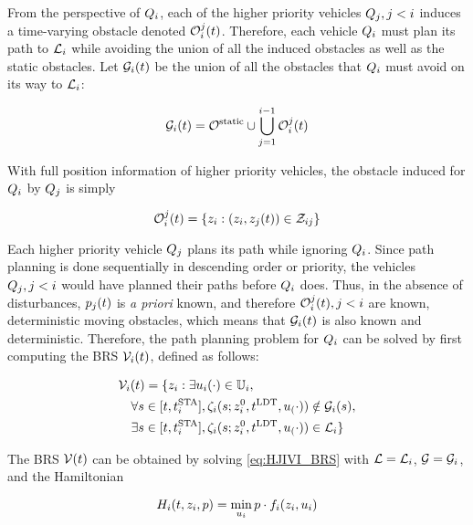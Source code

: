 From the perspective of $Q_i$, each of the higher priority vehicles $Q_j, j<i$ induces a time-varying obstacle denoted $\mathcal{O}_i^j(t)$. Therefore, each vehicle $Q_i$ must plan its path to $\mathcal{L}_i$ while avoiding the union of all the induced obstacles as well as the static obstacles. Let $\mathcal{G}_i(t)$ be the union of all the obstacles that $Q_i$ must avoid on its way to $\mathcal{L}_i$:

\begin{equation}
\label{eq:obsseti}
\obsset_i(t)  = \soset \cup \bigcup_{j=1}^{i-1} \ioset_i^j(t)
\end{equation}

With full position information of higher priority vehicles, the obstacle induced for $Q_i$ by $Q_j$ is simply

\begin{equation}
\label{eq:ioset}
\ioset_i^j(t) = \{\state_i: (\state_i, \state_j(t)) \in \dz_{ij}\}
\end{equation}

Each higher priority vehicle $Q_j$ plans its path while ignoring $Q_i$. Since path planning is done sequentially in descending order or priority, the vehicles $Q_j, j<i$ would have planned their paths before $Q_i$ does. Thus, in the absence of disturbances, $p_j(t)$ is \textit{a priori} known, and therefore $\mathcal{O}_i^j(t), j<i$ are known, deterministic moving obstacles, which means that $\mathcal{G}_i(t)$ is also known and deterministic. Therefore, the path planning problem for $Q_i$ can be solved by first computing the BRS $\mathcal{V}_i(t)$, defined as follows:

\begin{equation}
\label{eq:BRS_basic}
\begin{aligned}
&\brs_i(t) = \{\state_i: \exists \ctrl_i(\cdot) \in \cfset_i, \\
&\quad\forall s \in [t, \sta_i], \traj_i(s; \state^0_i, \ldt, \ctrl_(\cdot)) \notin \obsset_i(s), \\
&\quad\exists s \in [t, \sta_i], \traj_i(s; \state^0_i, \ldt, \ctrl_(\cdot)) \in \targetset_i\}
\end{aligned}
\end{equation}

The BRS $\mathcal{V}(t)$ can be obtained by solving \eqref{eq:HJIVI_BRS} with $\mathcal{L} = \mathcal{L}_i$, $\mathcal{G} = \mathcal{G}_i$, and the Hamiltonian 

\begin{equation}
\label{eq:basicham}
\ham_i(t, \state_i, p) = \min_{\ctrl_i} p \cdot \fdyn_i(\state_i, \ctrl_i)
\end{equation}

